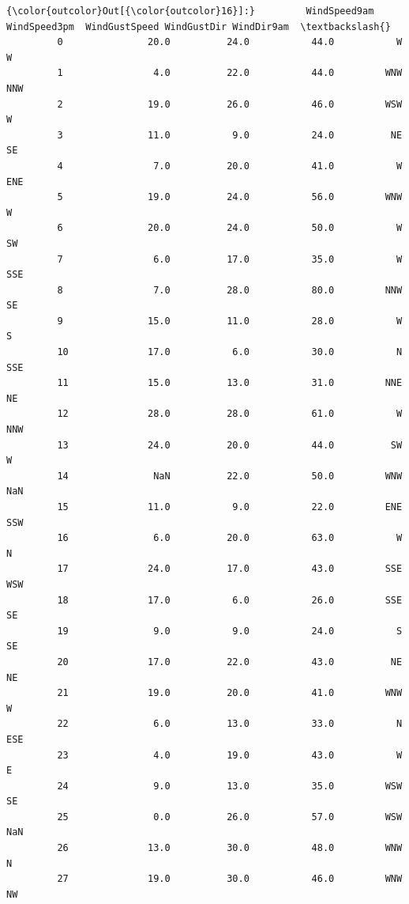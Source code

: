 \documentclass[11pt]{article}
\begin{document}
\begin{Verbatim}[commandchars=\\\{\}]
{\color{outcolor}Out[{\color{outcolor}16}]:}         WindSpeed9am  WindSpeed3pm  WindGustSpeed WindGustDir WindDir9am  \textbackslash{}
         0               20.0          24.0           44.0           W          W   
         1                4.0          22.0           44.0         WNW        NNW   
         2               19.0          26.0           46.0         WSW          W   
         3               11.0           9.0           24.0          NE         SE   
         4                7.0          20.0           41.0           W        ENE   
         5               19.0          24.0           56.0         WNW          W   
         6               20.0          24.0           50.0           W         SW   
         7                6.0          17.0           35.0           W        SSE   
         8                7.0          28.0           80.0         NNW         SE   
         9               15.0          11.0           28.0           W          S   
         10              17.0           6.0           30.0           N        SSE   
         11              15.0          13.0           31.0         NNE         NE   
         12              28.0          28.0           61.0           W        NNW   
         13              24.0          20.0           44.0          SW          W   
         14               NaN          22.0           50.0         WNW        NaN   
         15              11.0           9.0           22.0         ENE        SSW   
         16               6.0          20.0           63.0           W          N   
         17              24.0          17.0           43.0         SSE        WSW   
         18              17.0           6.0           26.0         SSE         SE   
         19               9.0           9.0           24.0           S         SE   
         20              17.0          22.0           43.0          NE         NE   
         21              19.0          20.0           41.0         WNW          W   
         22               6.0          13.0           33.0           N        ESE   
         23               4.0          19.0           43.0           W          E   
         24               9.0          13.0           35.0         WSW         SE   
         25               0.0          26.0           57.0         WSW        NaN   
         26              13.0          30.0           48.0         WNW          N   
         27              19.0          30.0           46.0         WNW         NW   

\end{Verbatim}
\end{document}
